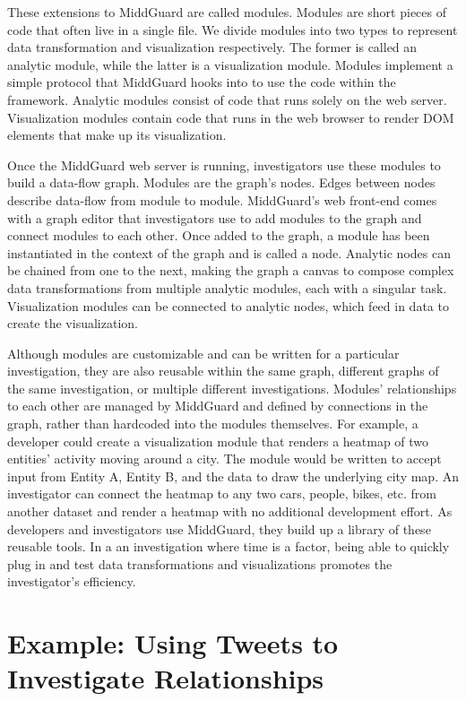 \documentclass[midd]{thesis}
\begin{document}
These extensions to MiddGuard are called modules. Modules are short pieces of
code that often live in a single file. We divide modules into two types to
represent data transformation and visualization respectively. The former is
called an analytic module, while the latter is a visualization module. Modules
implement a simple protocol that MiddGuard hooks into to use the code within the
framework. Analytic modules consist of code that runs solely on the web server.
Visualization modules contain code that runs in the web browser to render DOM
elements that make up its visualization.

Once the MiddGuard web server is running, investigators use these modules to
build a data-flow graph. Modules are the graph's nodes. Edges between nodes
describe data-flow from module to module. MiddGuard's web front-end comes with a
graph editor that investigators use to add modules to the graph and connect
modules to each other. Once added to the graph, a module has been instantiated
in the context of the graph and is called a node. Analytic nodes can be chained
from one to the next, making the graph a canvas to compose complex data
transformations from multiple analytic modules, each with a singular task.
Visualization modules can be connected to analytic nodes, which feed in data to
create the visualization.

Although modules are customizable and can be written for a particular
investigation, they are also reusable within the same graph, different graphs of
the same investigation, or multiple different investigations. Modules'
relationships to each other are managed by MiddGuard and defined by connections
in the graph, rather than hardcoded into the modules themselves. For example, a
developer could create a visualization module that renders a heatmap of two
entities' activity moving around a city. The module would be written to accept
input from Entity A, Entity B, and the data to draw the underlying city map. An
investigator can connect the heatmap to any two cars, people, bikes, etc. from
another dataset and render a heatmap with no additional development effort. As
developers and investigators use MiddGuard, they build up a library of these
reusable tools. In a an investigation where time is a factor, being able to
quickly plug in and test data transformations and visualizations promotes the
investigator's efficiency.

\section{Example: Using Tweets to Investigate Relationships}
\end{document}
